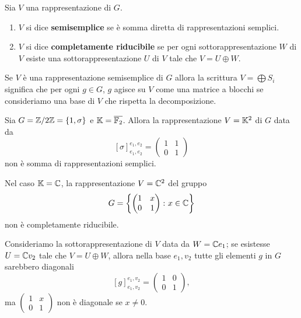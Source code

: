 \begin{definition}
    Sia $V$ una rappresentazione di $G$. \begin{enumerate}
        \item $V$ si dice \textbf{semisemplice} se è somma diretta di rappresentazioni semplici.
        \item $V$ si dice \textbf{completamente riducibile} se per ogni sottorappresentazione $W$ di $V$ esiste una sottorappresentazione $U$ di $V$ tale che $V=U\oplus W$.
    \end{enumerate}
\end{definition}

\begin{remark}
Se $V$ \`e una rappresentazione semisemplice di $G$ allora la scrittura $V=\bigoplus S_i$ significa che per ogni $g\in G$, $g$ agisce su $V$ come una matrice a blocchi se consideriamo una base di $V$ che rispetta la decomposizione.
\end{remark}

\begin{example}
    Sia $G={\mathbb{Z}/{2}\mathbb{Z}}=\{1,\sigma\}$ e $\mathbb{K}=\overline{\mathbb{F}_2}$. Allora la rappresentazione $V=\mathbb{K}^2$ di $G$ data da  \[[\sigma]_{e_1,e_2}^{e_1,e_2}=\begin{pmatrix}
        1 & 1 \\ 
        0 & 1
    \end{pmatrix}\] non è somma di rappresentazioni semplici. 
\end{example}


\begin{example}
    Nel caso $\mathbb{K}=\mathbb{C}$, la rappresentazione $V=\mathbb{C}^2$ del gruppo \[G=\left\{\begin{pmatrix}
        1 & x \\ 
        0 & 1
    \end{pmatrix} \colon x\in \mathbb{C}\right\}\] non è completamente riducibile.
\end{example}
\begin{solution}
Consideriamo la sottorappresentazione di $V$ data da $W=\mathbb{C} e_1$; se esistesse $U=\mathbb{C} v_2$ tale che $V=U\oplus W$, allora nella base $e_1,v_2$ tutte gli elementi $g$ in $G$ sarebbero diagonali \[[g]_{e_1,v_2}^{e_1,v_2}=
\begin{pmatrix}
        1 & 0 \\ 
        0 & 1
\end{pmatrix},\]
ma $\begin{pmatrix}
        1 & x \\ 
        0 & 1
\end{pmatrix}$ non è diagonale se $x\ne 0$.
\end{solution}

